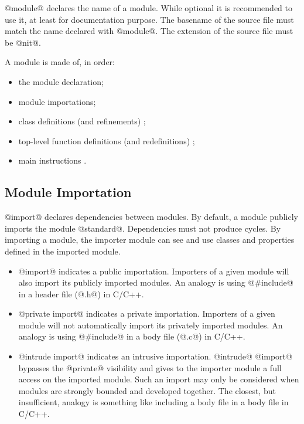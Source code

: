@module@ declares the name of a module.
While optional it is recommended to use it, at least for documentation purpose.
The basename of the source file must match the name declared with @module@.
The extension of the source file must be @nit@.

A module is made of, in order:
\begin{itemize}
\item the module declaration;
\item module importations;
\item class definitions (and refinements) ;
\item top-level function definitions (and redefinitions) ;
\item main instructions .
\end{itemize}

\subsection{Module Importation}\label{import}

@import@ declares dependencies between modules.
By default, a module publicly imports the module @standard@.
Dependencies must not produce cycles.
By importing a module, the importer module can see and use classes and properties defined in the imported module.

\begin{itemize}
\item @import@ indicates a public importation.
Importers of a given module will also import its publicly imported modules.
An analogy is using @#include@ in a header file (@.h@) in C/C++.
\item @private import@ indicates a private importation.
Importers of a given module will not automatically import its privately imported modules.
An analogy is using @#include@ in a body file (@.c@) in C/C++.
\item @intrude import@ indicates an intrusive importation.
@intrude@ @import@ bypasses the @private@ visibility and gives to the importer module a full access on the imported module.
Such an import may only be considered when modules are strongly bounded and developed together.
The closest, but insufficient, analogy is something like including a body file in a body file in C/C++.
\end{itemize}

